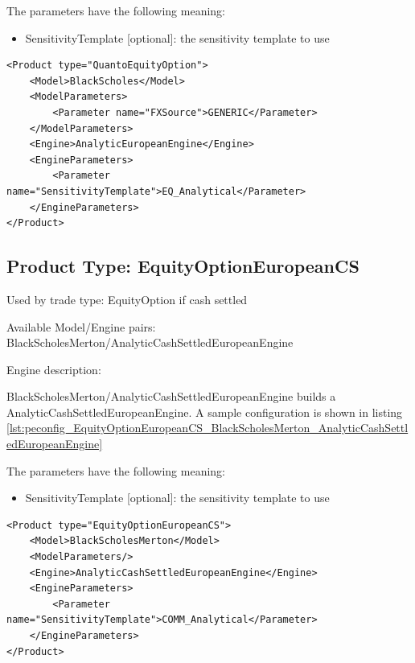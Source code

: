 The parameters have the following meaning:

\begin{itemize}
\item SensitivityTemplate [optional]: the sensitivity template to use
\end{itemize}

\begin{longlisting}
\begin{verbatim}
<Product type="QuantoEquityOption">
    <Model>BlackScholes</Model>
    <ModelParameters>
        <Parameter name="FXSource">GENERIC</Parameter>
    </ModelParameters>
    <Engine>AnalyticEuropeanEngine</Engine>
    <EngineParameters>
        <Parameter name="SensitivityTemplate">EQ_Analytical</Parameter>
    </EngineParameters>
</Product>
\end{verbatim}
\caption{Configuration for Product QuantoEquityOption, Model BlackScholes, Engine AnalyticEuropeanEngine}
\label{lst:peconfig_QuantoEquityOption_BlackScholes_AnalyticEuropeanEngine}
\end{longlisting}

\subsection{Product Type: EquityOptionEuropeanCS}

Used by trade type: EquityOption if cash settled

Available Model/Engine pairs: BlackScholesMerton/AnalyticCashSettledEuropeanEngine

Engine description:

BlackScholesMerton/AnalyticCashSettledEuropeanEngine builds a AnalyticCashSettledEuropeanEngine. A sample configuration is shown in listing
\ref{lst:peconfig_EquityOptionEuropeanCS_BlackScholesMerton_AnalyticCashSettledEuropeanEngine}

The parameters have the following meaning:

\begin{itemize}
\item SensitivityTemplate [optional]: the sensitivity template to use
\end{itemize}

\begin{longlisting}
\begin{verbatim}
<Product type="EquityOptionEuropeanCS">
    <Model>BlackScholesMerton</Model>
    <ModelParameters/>
    <Engine>AnalyticCashSettledEuropeanEngine</Engine>
    <EngineParameters>
        <Parameter name="SensitivityTemplate">COMM_Analytical</Parameter>
    </EngineParameters>
</Product>
\end{verbatim}
\caption{Configuration for Product EquityOptionEuropeanCS, Model BlackScholesMerton, Engine AnalyticCashSettledEuropeanEngine}
\label{lst:peconfig_EquityOptionEuropeanCS_BlackScholesMerton_AnalyticCashSettledEuropeanEngine}
\end{longlisting}

